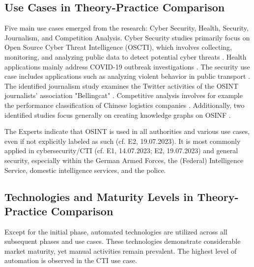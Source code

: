 \documentclass[10pt]{article}
\begin{document}
\subsection{Use Cases in Theory-Practice Comparison}

Five main use cases emerged from the research: Cyber Security, Health, Security, Journalism,
and Competition Analysis. Cyber Security studies primarily focus on Open Source Cyber Threat
Intelligence (OSCTI), which involves collecting, monitoring, and analyzing public
data to detect potential cyber threats \cite{Ahuja.2022,AlDmour.2023}.
Health applications mainly address COVID-19 outbreak investigations \cite{Kpozehouen.2020}.
The security use case includes applications such as
analyzing violent behavior in public transport \cite{Nobili.2021}. The identified journalism study examines the
Twitter activities of the OSINT journalists' association "Bellingcat" \cite{Bar.2023}. Competitive analysis
involves for example the performance classification of Chinese logistics companies \cite{Tao.2023}.
Additionally, two identified studies focus generally on creating knowledge graphs on OSINF \cite{Hu.2023, Ma.2022}.

The Experts indicate that OSINT is used in all authorities and various use cases, even if not explicitly labeled as such (cf. E2, 19.07.2023). It is most commonly applied in cybersecurity/CTI (cf. E1, 14.07.2023; E2, 19.07.2023) and general security, especially within the German Armed Forces, the (Federal) Intelligence Service, domestic intelligence services, and the police.

\subsection{Technologies and Maturity Levels in Theory-Practice Comparison}

Except for the initial phase, automated technologies are utilized across all subsequent phases and use cases.
These technologies demonstrate considerable market maturity, yet manual activities remain prevalent.
The highest level of automation is observed in the CTI use case.
\end{document}
